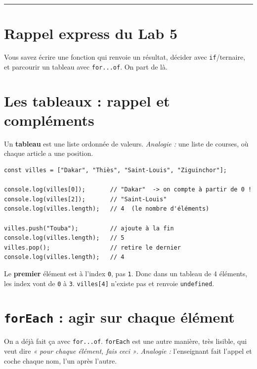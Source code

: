\documentclass[11pt,a4paper]{article}
\newcommand{\code}[1]{\texttt{#1}}
\begin{document}
\tableofcontents
\bigskip\hrule\bigskip

\section*{Rappel express du Lab 5}
Vous savez écrire une fonction qui renvoie un résultat, décider avec \code{if}/ternaire, et parcourir un tableau avec \code{for...of}. On part de là.

\section{Les tableaux : rappel et compléments}

Un \textbf{tableau} est une liste ordonnée de valeurs. \emph{Analogie :} une liste de courses, où chaque article a une position.

\begin{lstlisting}[style=js]
const villes = ["Dakar", "Thiès", "Saint-Louis", "Ziguinchor"];

console.log(villes[0]);       // "Dakar"  -> on compte à partir de 0 !
console.log(villes[2]);       // "Saint-Louis"
console.log(villes.length);   // 4  (le nombre d'éléments)

villes.push("Touba");         // ajoute à la fin
console.log(villes.length);   // 5
villes.pop();                 // retire le dernier
console.log(villes.length);   // 4
\end{lstlisting}

\begin{attentionbox}
Le \textbf{premier} élément est à l'index \code{0}, pas \code{1}. Donc dans un tableau de 4 éléments, les index vont de \code{0} à \code{3}. \code{villes[4]} n'existe pas et renvoie \code{undefined}.
\end{attentionbox}

\section{\texttt{forEach} : agir sur chaque élément}

On a déjà fait ça avec \code{for...of}. \code{forEach} est une autre manière, très lisible, qui veut dire \emph{« pour chaque élément, fais ceci »}. \emph{Analogie :} l'enseignant fait l'appel et coche chaque nom, l'un après l'autre.
\end{document}

